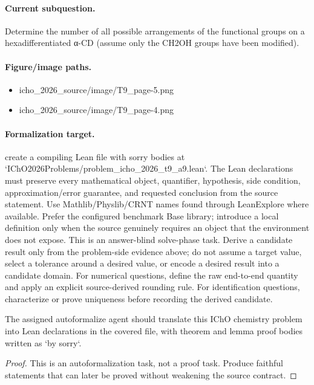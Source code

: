 \paragraph{Current subquestion.}
Determine the number of all possible arrangements of the functional groups on a hexadifferentiated α-CD (assume only the CH2OH groups have been modified).

\paragraph{Figure/image paths.}
\begin{itemize}
\item icho\_2026\_source/image/T9\_page-5.png
\item icho\_2026\_source/image/T9\_page-4.png
\end{itemize}

\paragraph{Formalization target.}
create a compiling Lean file with sorry bodies at `IChO2026Problems/problem\_icho\_2026\_t9\_a9.lean`.
The Lean declarations must preserve every mathematical object, quantifier, hypothesis, side condition, approximation/error guarantee, and requested conclusion from the source statement.
Use Mathlib/Physlib/CRNT names found through LeanExplore where available. Prefer the configured benchmark Base library; introduce a local definition only when the source genuinely requires an object that the environment does not expose.
This is an answer-blind solve-phase task. Derive a candidate result only from the problem-side evidence above; do not assume a target value, select a tolerance around a desired value, or encode a desired result into a candidate domain.
For numerical questions, define the raw end-to-end quantity and apply an explicit source-derived rounding rule. For identification questions, characterize or prove uniqueness before recording the derived candidate.

\begin{theorem}
\label{thm:physics:icho_2026_t9_a9:target}
The assigned autoformalize agent should translate this IChO chemistry problem into Lean declarations in the covered file, with theorem and lemma proof bodies written as `by sorry`.
\end{theorem}
\begin{proof}
This is an autoformalization task, not a proof task. Produce faithful statements that can later be proved without weakening the source contract.
\end{proof}
